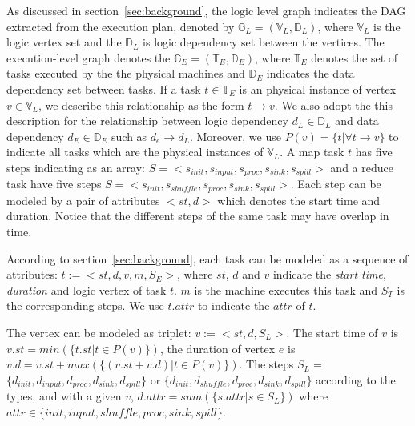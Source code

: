 As discussed in section~\ref{sec:background}, the logic level graph indicates the DAG extracted from the execution plan, denoted by $\mathbb{G}_L = (\mathbb{V}_L, \mathbb{D}_L)$, where $\mathbb{V}_L$ is the logic vertex set and the $\mathbb{D}_L$ is logic dependency set between the vertices. The execution-level graph denotes the $\mathbb{G}_E = (\mathbb{T}_E, \mathbb{D}_E)$, where $\mathbb{T}_E$ denotes the set of tasks executed by the the physical machines and $\mathbb{D}_E$ indicates the data dependency set between tasks. 
If a task $t \in \mathbb{T}_E$ is an physical instance of vertex $v \in \mathbb{V}_L$, we describe this relationship as the form $t \to v$. We also adopt the this description for the relationship between logic dependency $d_L \in \mathbb{D}_L$ and data dependency $d_E \in \mathbb{D}_E$ such as $d_e \to d_L$. Moreover, we use $P(v) = \{t|\forall t \to v\}$ to indicate all tasks which are the physical instances of $\mathbb{V}_L$. 
A map task $t$ has five steps indicating as an array: $S=<s_{init}, s_{input}, s_{proc}, s_{sink}, s_{spill}>$ and a reduce task have five steps $S=<s_{init}, s_{shuffle}, s_{proc}, s_{sink}, s_{spill}>$. Each step can be modeled by a pair of attributes $<st, d>$ which denotes the start time and duration. Notice that the different steps of the same task may have overlap in time.

According to section~\ref{sec:background}, each task can be modeled as a sequence of attributes: $t:=<st, d, v, m, S_E>$, where $st$, $d$ and $v$ indicate the \textit{start time}, \textit{duration} and logic vertex of task $t$.  $m$ is the machine executes this task and $S_T$ is the corresponding steps. We use $t.attr$ to indicate the $attr$ of $t$.

The vertex can be modeled as triplet: $v:=<st, d, S_L>$. The start time of $v$ is $v.st=min(\{t.st|t \in P(v)\})$, the duration of vertex $e$ is $v.d=v.st+max(\{(v.st+v.d)|t \in P(v) \})$. The steps $S_L=$ $\{d_{init}, d_{input}, d_{proc}, d_{sink}, d_{spill}\}$ or $\{d_{init}, d_{shuffle}, d_{proc}, d_{sink}, d_{spill}\}$ according to the types, and with a given $v$, $d.attr = sum(\{s.attr| s\in S_L\})$ where $attr \in \{init, input, shuffle, proc, sink, spill\}$. 